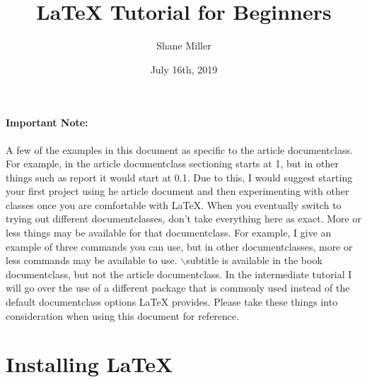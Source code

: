 \documentclass{article}
\title{\LaTeX{} Tutorial for Beginners}
\author{Shane Miller}
\date{July 16th, 2019}
\begin{document}
	\maketitle
	\newpage
	
	\tableofcontents
	\newpage

	
	\paragraph{Important Note:}
		A few of the examples in this document as specific to the article documentclass. For example, in the article documentclass sectioning starts at 1, but in other things such as report it would start at 0.1. Due to this, I would suggest starting your first project using he article document and then experimenting with other classes once you are comfortable with \LaTeX{}. When you eventually switch to trying out different documentclasses, don\rq{}t take everything here as exact. More or less things may be available for that documentclass. For example, I give an example of three commands you can use, but in other documentclasses, more or less commands may be available to use. $\backslash$subtitle is available in the book documentclass, but not the article documentclass. In the intermediate tutorial I will go over the use of a different package that is commonly used instead of the default documentclass options \LaTeX{} provides. Please take these things into consideration when using this document for reference.
	
	\section{Installing \LaTeX{}}
\end{document}
